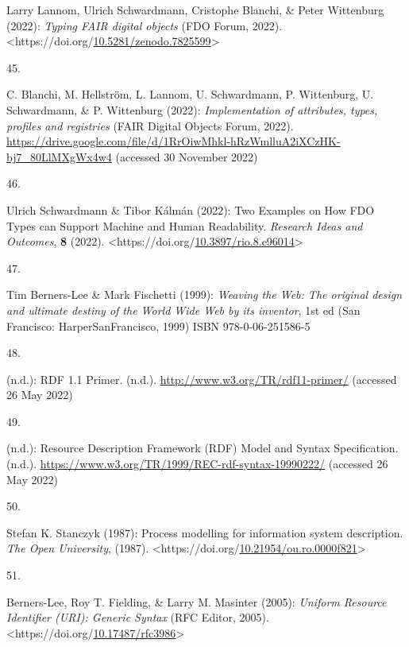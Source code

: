 \begin{thebibliography}{9}
Larry Lannom, Ulrich Schwardmann, Cristophe Blanchi, \& Peter Wittenburg
(2022): \emph{Typing {FAIR} digital objects} ({FDO Forum}, 2022).
\textless https://doi.org/\href{https://doi.org/10.5281/zenodo.7825599}{10.5281/zenodo.7825599}\textgreater{}

\hypertarget{ref-fdo-ImplAttributesTypesProfiles}{}
45.

C. Blanchi, M. Hellström, L. Lannom, U. Schwardmann, P. Wittenburg, U.
Schwardmann, \& P. Wittenburg (2022): \emph{Implementation of
attributes, types, profiles and registries} ({FAIR Digital Objects
Forum}, 2022).
\url{https://drive.google.com/file/d/1RrOiwMhkl-hRzWmlluA2iXCzHK-bj7_80LlMXgWx4w4}
(accessed 30 November 2022)

\hypertarget{ref-schwardmannTwoExamplesHow2022}{}
46.

Ulrich Schwardmann \& Tibor Kálmán (2022): Two {Examples} on {How FDO
Types} can {Support Machine} and {Human Readability}. \emph{Research
Ideas and Outcomes}, \textbf{8} (2022).
\textless https://doi.org/\href{https://doi.org/10.3897/rio.8.e96014}{10.3897/rio.8.e96014}\textgreater{}

\hypertarget{ref-berners-leeWeavingWebOriginal1999}{}
47.

Tim Berners-Lee \& Mark Fischetti (1999): \emph{Weaving the {Web}: The
original design and ultimate destiny of the {World Wide Web} by its
inventor}, 1st ed ({San Francisco}: {HarperSanFrancisco}, 1999) ISBN
978-0-06-251586-5

\hypertarget{ref-w3-rdf11-primer}{}
48.

(n.d.): {RDF} 1.1 {Primer}. (n.d.).
\url{http://www.w3.org/TR/rdf11-primer/} (accessed 26 May 2022)

\hypertarget{ref-w3-rdf-syntax}{}
49.

(n.d.): Resource {Description Framework} ({RDF}) {Model} and {Syntax
Specification}. (n.d.).
\url{https://www.w3.org/TR/1999/REC-rdf-syntax-19990222/} (accessed 26
May 2022)

\hypertarget{ref-stanczykProcessModellingInformation1987}{}
50.

Stefan K. Stanczyk (1987): Process modelling for information system
description. \emph{The Open University}, (1987).
\textless https://doi.org/\href{https://doi.org/10.21954/ou.ro.0000f821}{10.21954/ou.ro.0000f821}\textgreater{}

\hypertarget{ref-rfc3986}{}
51.

Berners-Lee, Roy T. Fielding, \& Larry M. Masinter (2005): \emph{Uniform
{Resource Identifier} ({URI}): {Generic Syntax}} ({RFC Editor}, 2005).
\textless https://doi.org/\href{https://doi.org/10.17487/rfc3986}{10.17487/rfc3986}\textgreater{}


\end{thebibliography}
